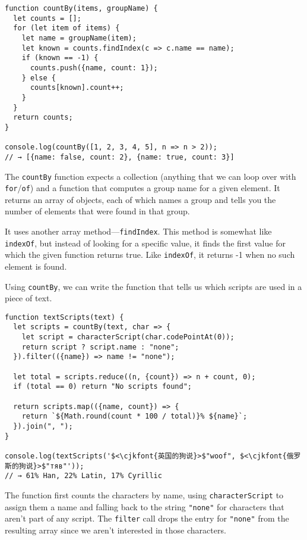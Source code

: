 \begin{lstlisting}
function countBy(items, groupName) {
  let counts = [];
  for (let item of items) {
    let name = groupName(item);
    let known = counts.findIndex(c => c.name == name);
    if (known == -1) {
      counts.push({name, count: 1});
    } else {
      counts[known].count++;
    }
  }
  return counts;
}

console.log(countBy([1, 2, 3, 4, 5], n => n > 2));
// → [{name: false, count: 2}, {name: true, count: 3}]
\end{lstlisting}
\noindent

The \lstinline`countBy` function expects a collection (anything that we can loop over with \lstinline`for`/\lstinline`of`) and a function that computes a group name for a given element. It returns an array of objects, each of which names a group and tells you the number of elements that were found in that group.

It uses another array method—\lstinline`findIndex`. This method is somewhat like \lstinline`indexOf`, but instead of looking for a specific value, it finds the first value for which the given function returns true. Like \lstinline`indexOf`, it returns -1 when no such element is found.

Using \lstinline`countBy`, we can write the function that tells us which scripts are used in a piece of text.

\begin{lstlisting}
function textScripts(text) {
  let scripts = countBy(text, char => {
    let script = characterScript(char.codePointAt(0));
    return script ? script.name : "none";
  }).filter(({name}) => name != "none");

  let total = scripts.reduce((n, {count}) => n + count, 0);
  if (total == 0) return "No scripts found";

  return scripts.map(({name, count}) => {
    return `${Math.round(count * 100 / total)}% ${name}`;
  }).join(", ");
}

console.log(textScripts('$<\cjkfont{英国的狗说}>$"woof", $<\cjkfont{俄罗斯的狗说}>$"тяв"'));
// → 61% Han, 22% Latin, 17% Cyrillic
\end{lstlisting}
\noindent{}

The function first counts the characters by name, using \lstinline`characterScript` to assign them a name and falling back to the string \lstinline`"none"` for characters that aren't part of any script. The \lstinline`filter` call drops the entry for \lstinline`"none"` from the resulting array since we aren't interested in those characters.

